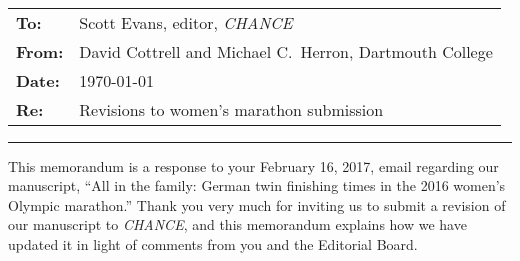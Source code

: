 \documentclass[12pt]{article}
\begin{document}
\thispagestyle{empty}


\\[0.5in]

\noindent
\begin{tabular}{ll}
  \textbf{To:} &  Scott Evans, editor, \emph{CHANCE}\\
  \textbf{From:} & David Cottrell and Michael C.\ Herron, Dartmouth College\\
  \textbf{Date:} & \today \\
  \textbf{Re:} &  Revisions to women's marathon submission
\end{tabular}

\vspace{.1in}
\hrule
\vspace{.2in}

\bigskip

This memorandum is a response to your February 16, 2017, email
regarding our manuscript, ``All in the family: German twin finishing
times in the 2016 women's Olympic marathon.'' Thank you very much for
inviting us to submit a revision of our manuscript to \emph{CHANCE},
and this memorandum explains how we have updated it in light of
comments from you and the Editorial Board.
\end{document}

